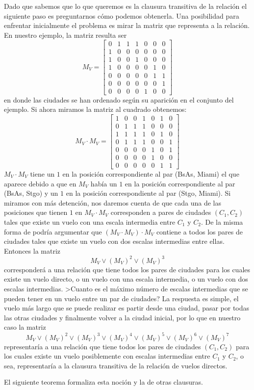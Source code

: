 \begin{ejemplo}
Dado que sabemos que lo que queremos es la clausura transitiva de la relación 
el siguiente paso es preguntarnos cómo podemos obtenerla.
Una posibilidad para enfrentar inicialmente el problema es mirar la matriz que representa a la relación.
En nuestro ejemplo, la matriz resulta ser
\[
M_{V}=\left[\begin{array}{ccccccc}
0 & 1 & 1 & 1 & 0 & 0 & 0 \\
1 & 0 & 0 & 0 & 0 & 0 & 0 \\
1 & 0 & 0 & 1 & 0 & 0 & 0 \\
1 & 0 & 0 & 0 & 0 & 1 & 0 \\
0 & 0 & 0 & 0 & 0 & 1 & 1 \\
0 & 0 & 0 & 0 & 0 & 0 & 1 \\
0 & 0 & 0 & 0 & 1 & 0 & 0 
\end{array}
\right]
\]
en donde las ciudades se han ordenado según su aparición en el conjunto del ejemplo.
Si ahora miramos la matriz al cuadrado obtenemos:
\[
M_V\cdot M_V=\left[\begin{array}{ccccccc}
1 & 0 & 0 & 1 & 0 & 1 & 0 \\
0 & 1 & 1 & 1 & 0 & 0 & 0 \\
1 & 1 & 1 & 1 & 0 & 1 & 0 \\
0 & 1 & 1 & 1 & 0 & 0 & 1 \\
0 & 0 & 0 & 0 & 1 & 0 & 1 \\
0 & 0 & 0 & 0 & 1 & 0 & 0 \\
0 & 0 & 0 & 0 & 0 & 1 & 1 
\end{array}
\right]
\]
$M_V\cdot M_V$ tiene un $1$ en la posición correspondiente al par (BsAs, Miami) el que aparece debido a que en $M_V$ había un $1$ en la posición correspondiente al par (BsAs, Stgo) y un $1$ en la posición correspondiente al par (Stgo, Miami).
Si miramos con más detención, nos daremos cuenta de que cada una de las posiciones que tienen $1$ en $M_V\cdot M_V$ corresponden a pares de ciudades $(C_1,C_2)$ tales que existe un vuelo con una escala intermedia entre $C_1$ y $C_2$.
De la misma forma de podría argumentar que $(M_V\cdot M_V)\cdot M_V$ contiene a todos los pares de ciudades tales que existe un vuelo con dos escalas intermedias entre ellas.
Entonces la matriz
$$M_V\vee(M_V)^2\vee(M_V)^3$$
corresponderá a una relación que tiene todos los pares de ciudades para los cuales existe un vuelo directo, o un vuelo con una escala intermedia, o un vuelo con dos escalas intermedias.
>Cuanto es el máximo número de escalas intermedias que se pueden tener en un vuelo entre un par de ciudades? 
La respuesta es simple, el vuelo más largo que se puede realizar es partir desde una ciudad, pasar por todas las otras ciudades y finalmente volver a la ciudad inicial, por lo que en nuestro caso la matriz
$$M_V\vee(M_V)^2\vee(M_V)^3\vee(M_V)^4\vee(M_V)^5\vee(M_V)^6\vee(M_V)^7$$
representaría a una relación que tiene todos los pares de ciudades $(C_1,C_2)$ para los cuales existe un vuelo posiblemente con escalas intermedias entre $C_1$ y $C_2$, o sea, representaría a la clausura transitiva de la relación de vuelos directos.

El siguiente teorema formaliza esta noción y la de otras clausuras.
\end{ejemplo}

